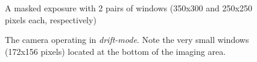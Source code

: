 \begin{figure}  
  \centering
  \setlength{\fboxsep}{0pt}
  \setlength{\fboxrule}{1pt}
  \caption{A masked exposure with 2 pairs of windows (350x300 and 250x250 pixels each, respectively)}
  \label{fig:V713Cep}
\end{figure}

\begin{figure}  
  \centering
  \setlength{\fboxsep}{0pt}
  \setlength{\fboxrule}{1pt}
  \caption{The camera operating in \emph{drift-mode}. Note the very small windows (172x156 pixels) located at the bottom of the imaging area.}
  \label{fig:V834Cen}
\end{figure}

